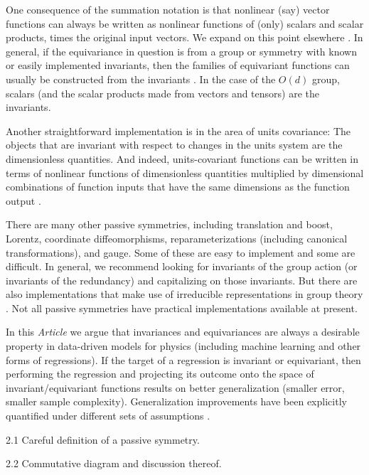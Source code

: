 \documentclass{article}
\theoremstyle{plain}
\theoremstyle{definition}
\theoremstyle{remark}
\newcommand{\documentname}{\textsl{Article}}
\begin{document}
One consequence of the summation notation is that nonlinear (say) vector functions can always be written as nonlinear functions of (only) scalars and scalar products, times the original input vectors.
We expand on this point elsewhere \cite{villar2021scalars}.
In general, if the equivariance in question is from a group or symmetry with known or easily implemented invariants, then the families of equivariant functions can usually be constructed from the invariants \cite{blum2022equivariant}.
In the case of the $O(d)$ group, scalars (and the scalar products made from vectors and tensors) are the invariants.

Another straightforward implementation is in the area of units covariance:
The objects that are invariant with respect to changes in the units system are the dimensionless quantities.
And indeed, units-covariant functions can be written in terms of nonlinear functions of dimensionless quantities multiplied by dimensional combinations of function inputs that have the same dimensions as the function output \cite{villar2022dimensionless}.

There are many other passive symmetries, including translation and boost, Lorentz, coordinate diffeomorphisms, reparameterizations (including canonical transformations), and gauge.
Some of these are easy to implement and some are difficult.
In general, we recommend looking for invariants of the group action (or invariants of the redundancy) and capitalizing on those invariants.
But there are also implementations that make use of irreducible representations in group theory \cite{fuchs2020se, thomas2018tensor, geiger2022e3nn}.
Not all passive symmetries have practical implementations available at present.

In this \documentname{} we argue that invariances and equivariances are always a desirable property in data-driven models for physics (including machine learning and other forms of regressions).
If the target of a regression is invariant or equivariant, then performing the regression and projecting its outcome onto the space of invariant/equivariant functions results on better generalization (smaller error, smaller sample complexity).
Generalization improvements have been explicitly quantified under different sets of assumptions \cite{bietti2021sample, elesedy2021provably, mei2021learning, elesedy2021kernel}. 

   
   
   
   2.1 Careful definition of a passive symmetry.
   
   2.2 Commutative diagram and discussion thereof.
   
\end{document}
